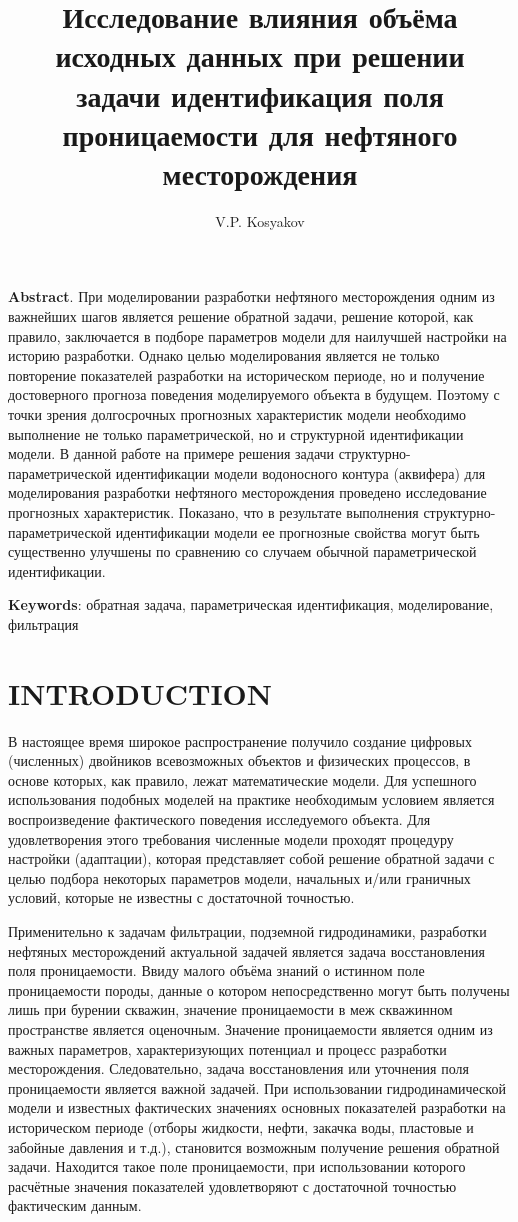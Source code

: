 \documentclass{article}
\title{Исследование влияния объёма исходных данных при решении задачи идентификация поля проницаемости для нефтяного месторождения}
\author{V.P. Kosyakov}
\begin{document}
	\maketitle
	\textbf{Abstract}. При моделировании разработки нефтяного месторождения одним из важнейших шагов является решение обратной задачи, решение которой, как правило, заключается в подборе параметров модели для наилучшей настройки на историю разработки. Однако целью моделирования является не только повторение показателей разработки на историческом периоде, но и получение достоверного прогноза поведения моделируемого объекта в будущем. Поэтому с точки зрения долгосрочных прогнозных характеристик модели необходимо выполнение не только параметрической, но и структурной идентификации модели.
В данной работе на примере решения задачи структурно-параметрической идентификации модели водоносного контура (аквифера) для моделирования разработки нефтяного месторождения проведено исследование прогнозных характеристик. Показано, что в результате выполнения структурно-параметрической идентификации модели ее прогнозные свойства могут быть существенно улучшены по сравнению со случаем обычной параметрической идентификации. 

\textbf{Keywords}: обратная задача, параметрическая идентификация, моделирование, фильтрация

\section{INTRODUCTION}
	В настоящее время широкое распространение получило создание цифровых (численных) двойников всевозможных объектов и физических процессов, в основе которых, как правило, лежат математические модели. Для успешного использования подобных моделей на практике необходимым условием является воспроизведение фактического поведения исследуемого объекта. Для удовлетворения этого требования численные модели проходят процедуру настройки (адаптации), которая представляет собой решение обратной задачи с целью подбора некоторых параметров модели, начальных и/или граничных условий, которые не известны с достаточной точностью. 
	
	Применительно к задачам фильтрации, подземной гидродинамики, разработки нефтяных месторождений актуальной задачей является задача восстановления поля проницаемости. Ввиду малого объёма знаний о истинном поле проницаемости породы, данные о котором непосредственно могут быть получены лишь при бурении скважин, значение проницаемости в меж скважинном пространстве является оценочным. Значение проницаемости является одним из  важных параметров, характеризующих потенциал и процесс разработки месторождения. Следовательно, задача восстановления или уточнения поля проницаемости является важной задачей. При использовании гидродинамической модели и известных фактических значениях основных показателей разработки на историческом периоде (отборы жидкости, нефти, закачка воды, пластовые и забойные давления и т.д.), становится возможным получение решения обратной задачи. Находится такое поле проницаемости, при использовании которого расчётные значения показателей удовлетворяют с достаточной точностью фактическим данным.
	
\end{document}
